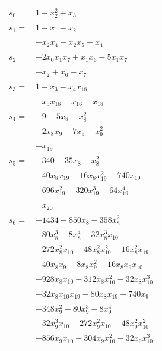 \begingroup
\small
\setlength{\tabcolsep}{2pt}
\setlength{\LTleft}{0pt}
\begin{longtable}{@{}r@{\;}l@{}}
\(s_{0}=\) & \(\displaystyle 1 -x_{2}^{2} +x_{3}\) \\[3pt]
\(s_{1}=\) & \(\displaystyle 1 +x_{1} -x_{2}\) \\
 & \(\displaystyle -x_{2}x_{4} -x_{2}x_{5} -x_{4}\) \\[3pt]
\(s_{2}=\) & \(\displaystyle -2x_{0}x_{1}x_{7} +x_{1}x_{6} -5x_{1}x_{7}\) \\
 & \(\displaystyle +x_{2} +x_{6} -x_{7}\) \\[3pt]
\(s_{3}=\) & \(\displaystyle 1 -x_{3} -x_{4}x_{18}\) \\
 & \(\displaystyle -x_{5}x_{18} +x_{16} -x_{18}\) \\[3pt]
\(s_{4}=\) & \(\displaystyle -9 -5x_{8} -x_{8}^{2}\) \\
 & \(\displaystyle -2x_{8}x_{9} -7x_{9} -x_{9}^{2}\) \\
 & \(\displaystyle +x_{19}\) \\[3pt]
\(s_{5}=\) & \(\displaystyle -340 -35x_{8} -x_{8}^{2}\) \\
 & \(\displaystyle -40x_{8}x_{19} -16x_{8}x_{19}^{2} -740x_{19}\) \\
 & \(\displaystyle -696x_{19}^{2} -320x_{19}^{3} -64x_{19}^{4}\) \\
 & \(\displaystyle +x_{20}\) \\[3pt]
\(s_{6}=\) & \(\displaystyle -1434 -850x_{8} -358x_{8}^{2}\) \\
 & \(\displaystyle -80x_{8}^{3} -8x_{8}^{4} -32x_{8}^{3}x_{10}\) \\
 & \(\displaystyle -272x_{8}^{2}x_{10} -48x_{8}^{2}x_{10}^{2} -16x_{8}^{2}x_{19}\) \\
 & \(\displaystyle -40x_{8}x_{9} -8x_{8}x_{9}^{2} -16x_{8}x_{9}x_{10}\) \\
 & \(\displaystyle -928x_{8}x_{10} -312x_{8}x_{10}^{2} -32x_{8}x_{10}^{3}\) \\
 & \(\displaystyle -32x_{8}x_{10}x_{19} -80x_{8}x_{19} -740x_{9}\) \\
 & \(\displaystyle -348x_{9}^{2} -80x_{9}^{3} -8x_{9}^{4}\) \\
 & \(\displaystyle -32x_{9}^{3}x_{10} -272x_{9}^{2}x_{10} -48x_{9}^{2}x_{10}^{2}\) \\
 & \(\displaystyle -856x_{9}x_{10} -304x_{9}x_{10}^{2} -32x_{9}x_{10}^{3}\) \\

\end{longtable}
